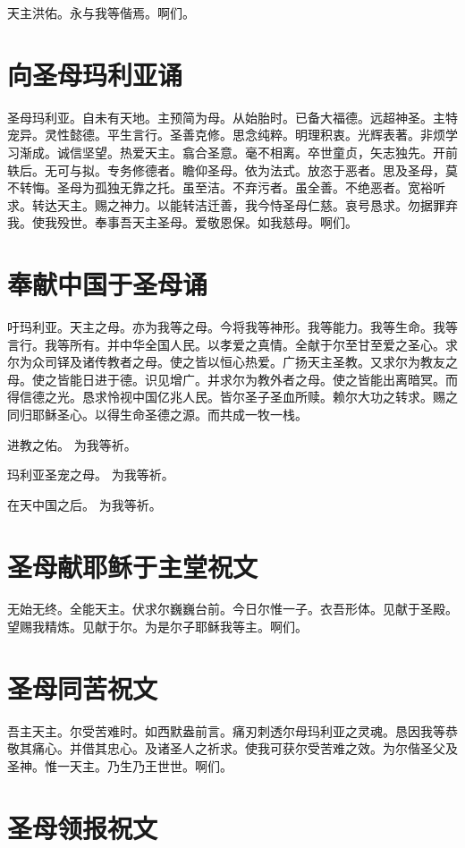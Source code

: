 \documentclass[UTF8,17pt]{ctexart}
\begin{document}
天主洪佑。永与我等偕焉。啊们。

\section{向圣母玛利亚诵}

圣母玛利亚。⾃未有天地。主预简为母。从始胎时。已备⼤福德。远超神圣。主特宠异。灵性懿德。平⽣⾔⾏。圣善克修。思念纯粹。明理积衷。光辉表著。⾮烦学习渐成。诚信坚望。热爱天主。翕合圣意。毫不相离。卒世童贞，⽮志独先。开前轶后。⽆可与拟。专务修德者。瞻仰圣母。依为法式。放恣于恶者。思及圣母，莫不转悔。圣母为孤独⽆靠之托。虽⾄洁。不弃污者。虽全善。不绝恶者。宽裕听求。转达天主。赐之神⼒。以能转洁迁善，我今恃圣母仁慈。哀号恳求。勿据罪弃我。使我殁世。奉事吾天主圣母。爱敬恩保。如我慈母。啊们。

\section{奉献中国于圣母诵}

吁玛利亚。天主之母。亦为我等之母。今将我等神形。我等能⼒。我等⽣命。我等⾔⾏。我等所有。并中华全国⼈民。以孝爱之真情。全献于尔⾄⽢⾄爱之圣⼼。求尔为众司铎及诸传教者之母。使之皆以恒⼼热爱。⼴扬天主圣教。又求尔为教友之母。使之皆能⽇进于德。识见增⼴。并求尔为教外者之母。使之皆能出离暗冥。⽽得信德之光。恳求怜视中国亿兆⼈民。皆尔圣⼦圣⾎所赎。赖尔⼤功之转求。赐之同归耶稣圣⼼。以得⽣命圣德之源。⽽共成⼀牧⼀栈。

进教之佑。 \hfill 为我等祈。

玛利亚圣宠之母。 \hfill 为我等祈。

在天中国之后。 \hfill 为我等祈。

\section{圣母献耶稣于主堂祝⽂}

⽆始⽆终。全能天主。伏求尔巍巍台前。今⽇尔惟⼀⼦。⾐吾形体。见献于圣殿。望赐我精炼。见献于尔。为是尔⼦耶稣我等主。啊们。

\section{圣母同苦祝⽂}

吾主天主。尔受苦难时。如西默盎前⾔。痛刃刺透尔母玛利亚之灵魂。恳因我等恭敬其痛⼼。并借其忠⼼。及诸圣⼈之祈求。使我可获尔受苦难之效。为尔偕圣⽗及圣神。惟⼀天主。乃⽣乃王世世。啊们。

\section{圣母领报祝⽂}
\end{document}
